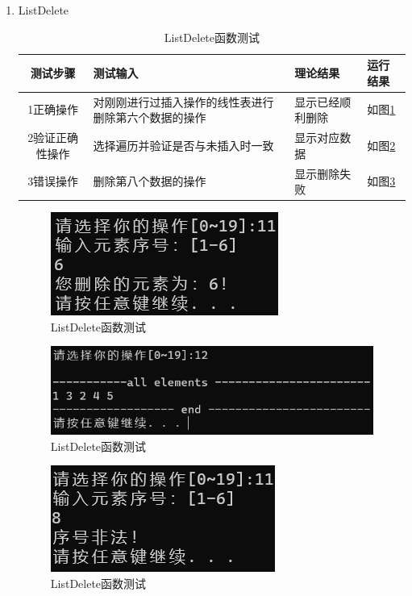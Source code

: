 \documentclass[supercite]{Experimental_Report}
\theoremstyle{definition}
\begin{document}
\begin{enumerate}
	
	
	\item ListDelete
	
	\begin{table}[h!]
		\begin{center}
			\caption{ListDelete函数测试}
			\begin{tabular}{|c|p{4cm}<{\centering}|p{4cm}<{\centering}|p{4cm}<{\centering}|} 
				\hline
				\textbf{测试步骤} & \textbf{测试输入} & \textbf{理论结果} & \textbf{运行结果} \\
				\hline
				1正确操作 & 对刚刚进行过插入操作的线性表进行删除第六个数据的操作 & 显示已经顺利删除 & 如图\ref{fig1-10-1}\\
				\hline
				2验证正确性操作 & 选择遍历并验证是否与未插入时一致 & 显示对应数据 & 如图\ref{fig1-10-2}\\
				\hline
				3错误操作 & 删除第八个数据的操作 & 显示删除失败 & 如图\ref{fig1-10-3}\\
				\hline
			\end{tabular}
		\end{center}
	\end{table}
	
	
	\begin{figure}[H] %
		\begin{center}
			\includegraphics[width=0.5\linewidth]{images/linklist/11-1.png}
			\caption{ListDelete函数测试}
			\label{fig1-10-1}
		\end{center}
	\end{figure}
	
	\begin{figure}[H] %
		\begin{center}
			\includegraphics[width=0.5\linewidth]{images/linklist/12-1.png}
			\caption{ListDelete函数测试}
			\label{fig1-10-2}
		\end{center}
	\end{figure}
	
	\begin{figure}[H] %
		\begin{center}
			\includegraphics[width=0.5\linewidth]{images/linklist/11-2.png}
			\caption{ListDelete函数测试}
			\label{fig1-10-3}
		\end{center}
	\end{figure}
	

\end{enumerate}
\end{document}
